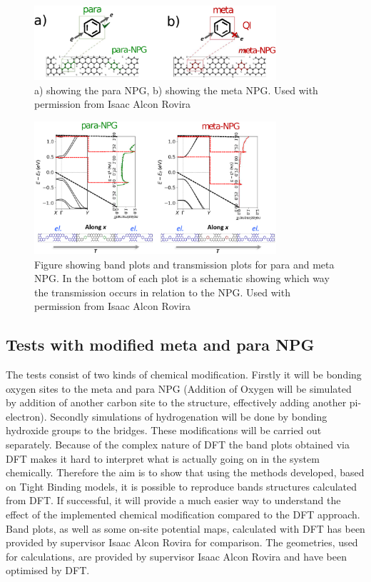 \begin{figure}[ht]
	\centering
	\includegraphics[width=0.8\textwidth]{Figures/Metaparagraphic.eps}
	\caption{a) showing the para NPG, b) showing the meta NPG. Used with permission from Isaac Alcon Rovira} 
	\label{Metaparastructfig}
\end{figure}
\begin{figure}[ht]
	\centering
	\includegraphics[width=0.8\textwidth]{Figures/metapararesultdraft.eps}
	\caption{Figure showing band plots and transmission plots for para and meta NPG. In the bottom of each plot is a schematic showing which way the transmission occurs in relation to the NPG. Used with permission from Isaac Alcon Rovira}
	\label{metapara}
\end{figure}
\newpage
\subsection{Tests with modified meta and para NPG}\label{test1}
The tests consist of two kinds of chemical modification. Firstly it will be bonding oxygen sites to the meta and para NPG (Addition of Oxygen will be simulated by addition of another carbon site to the structure, effectively adding another pi-electron). Secondly simulations of hydrogenation will be done by bonding hydroxide groups to the bridges. These modifications will be carried out separately. Because of the complex nature of DFT the band plots obtained via DFT makes it hard to interpret what is actually going on in the system chemically. Therefore the aim is to show that using the methods developed, based on Tight Binding models, it is possible to reproduce bands structures calculated from DFT. If successful, it will provide a much easier way to understand the effect of the implemented chemical modification compared to the DFT approach. Band plots, as well as some on-site potential maps, calculated with DFT has been provided by supervisor Isaac Alcon Rovira for comparison. The geometries, used for calculations, are provided by supervisor Isaac Alcon Rovira and have been optimised by DFT.
